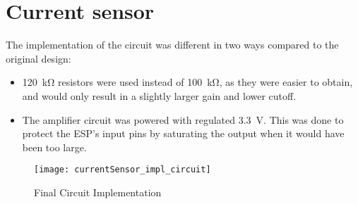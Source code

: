 \graphicspath{{content/chapter4/figures/}}
\section{Current sensor}\label{sec:current_sensor_physical}

The implementation of the circuit was different in two ways compared to the original design:
\begin{itemize}
   \item \SI{120}{\kilo\ohm} resistors were used instead of \SI{100}{\kilo\ohm}, as they were easier to obtain, and would only result in a
         slightly larger gain and lower cutoff.
   \item The amplifier circuit was powered with regulated \SI{3.3}{V}. This was done to protect the ESP's input pins by saturating the output
         when it would have been too large.
\end{itemize}

\begin{figure}[!htb]
  \centering
  \texttt{[image: currentSensor\_impl\_circuit]}
  \caption{Final Circuit Implementation}
\end{figure}